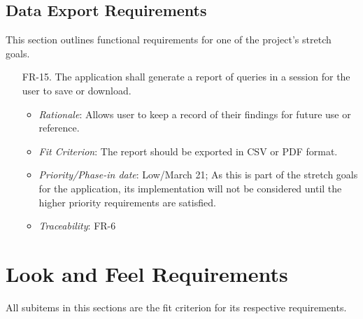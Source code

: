 \documentclass[12pt]{article}
\begin{document}
\subsection{Data Export Requirements}
This section outlines functional requirements for one of the project's stretch goals.
\begin{enumerate}
  \item[FR-15.] The application shall generate a report of queries in a session for the user to save or download.
  \begin{itemize}
    \item \textit{Rationale}: Allows user to keep a record of their findings for future use or reference.
    \item \textit{Fit Criterion}: The report should be exported in CSV or PDF format.
    \item \textit{Priority/Phase-in date}: Low/March 21; As this is part of the stretch goals for the application, its implementation will not be considered until the higher priority requirements are satisfied.
    \item \textit{Traceability}: FR-6
  \end{itemize}
\end{enumerate}

\section{Look and Feel Requirements}
All subitems in this sections are the fit criterion for its respective requirements. 
\end{document}

